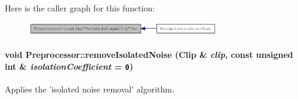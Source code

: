 Here is the caller graph for this function:\nopagebreak
\begin{figure}[H]
\begin{center}
\leavevmode
\includegraphics[width=236pt]{class_preprocessor_72aa2eb5f3a7e7ee0d3ca27ddd6bfc5e_icgraph}
\end{center}
\end{figure}
\hypertarget{class_preprocessor_a3e047486a0a80f2103f51d7141e41c5}{
\paragraph[{removeIsolatedNoise}]{\setlength{\rightskip}{0pt plus 5cm}void Preprocessor::removeIsolatedNoise ({\bf Clip} \& {\em clip}, \/  const unsigned int \& {\em isolationCoefficient} = {\tt 0})}\hfill}
\label{class_preprocessor_a3e047486a0a80f2103f51d7141e41c5}


Applies the 'isolated noise removal' algorithm. 

